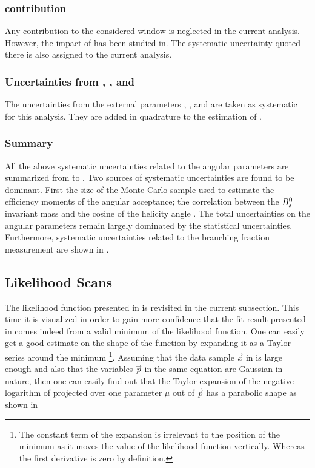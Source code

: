 \subsubsection{\dwave contribution}
\label{systCSP}
Any \dwave contribution to the considered \mkpi window is neglected in the current analysis.
However, the impact of \dwave has been studied in\cite{bsjpsikst-paper}. The systematic uncertainty
quoted there is also assigned to the current analysis.

\subsubsection{Uncertainties from \fdfs, \BRof\BdJpsiKst, and \BRof\BsJpsiPhi}
The uncertainties from the external parameters \fdfs, \BRof\BdJpsiKst, and \BRof\BsJpsiPhi are
taken as systematic for this analysis. They are added in quadrature to the estimation of
\BRof\BsJpsiKst.

\subsubsection{Summary}
\label{systSummary}
All the above systematic uncertainties related to the angular parameters are summarized from 
to . Two sources of systematic uncertainties are found to be dominant. First the size of the Monte
Carlo sample used to estimate the efficiency moments of the angular acceptance; the correlation between the $B^0_s$ invariant
mass and the cosine of the helicity angle \thetamu. The total uncertainties on the angular parameters remain largely dominated
by the statistical uncertainties. Furthermore, systematic uncertainties related to the branching fraction measurement
are shown in .

\subsection{Likelihood Scans}
\label{nllscans}

The likelihood function presented in  is revisited in the current subsection.
This time it is visualized in order to gain more confidence that the fit result presented in 
comes indeed from a valid minimum of the likelihood function. One can easily get a good estimate on the shape of the function
by expanding it as a Taylor series around the
minimum \footnote{The constant term of the
expansion is irrelevant to the position of the minimum as it moves the value of the likelihood function vertically. Whereas
the first derivative is zero by definition.}. Assuming that the data sample $\vec{x}$ in  is large enough
and also that the variables $\vec{p}$ in the same equation are Gaussian in nature, then one can easily find out that the
Taylor expansion of the negative logarithm of  projected over one parameter $\mu$ out of $\vec{p}$ has a
parabolic shape as shown in 


